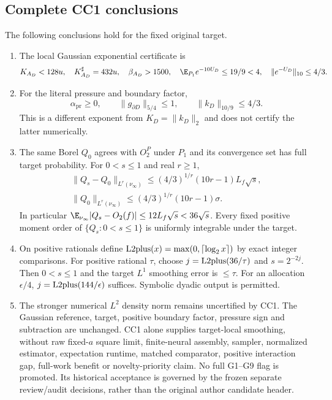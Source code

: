 \subsection{Complete CC1 conclusions}
\begin{theorem}\label{cm:CC1}
The following conclusions hold for the fixed original target.
\begin{enumerate}[label=\textup{CC1.\arabic*},leftmargin=4.6em]
\item The local Gaussian exponential certificate is
\[
 K_{A_D}<128u,\quad K^\sharp_{A_D}=432u,\quad\beta_{A_D}>1500,\quad
 \E_{P_1}e^{-10U_D}\le19/9<4,\quad\|e^{-U_D}\|_{10}\le4/3.
\]
\item For the literal pressure and boundary factor,
\[
 \alpha_{\mathrm{pr}}\ge0,\qquad
 \|g_{\partial D}\|_{5/4}\le1,\qquad \|k_D\|_{10/9}\le4/3.
\]
This is a different exponent from $K_D=\|k_D\|_2$ and does not certify
the latter numerically.
\item The same Borel $Q_0$ agrees with $O_2^P$ under $P_1$ and its
convergence set has full target probability. For $0<s\le1$ and real $r\ge1$,
\begin{gather*}
 \|Q_s-Q_0\|_{L^r(\nu_\infty)}
 \le(4/3)^{1/r}(10r-1)L_f\sqrt s,\\
 \|Q_0\|_{L^r(\nu_\infty)}
 \le(4/3)^{1/r}(10r-1)\sigma.
\end{gather*}
In particular
$\E_{\nu_\infty}|Q_s-O_2(f)|\le12L_f\sqrt s<36\sqrt s$.
Every fixed positive moment order of $\{Q_s:0<s\le1\}$ is uniformly
integrable under the target.
\item On positive rationals define
$\operatorname{L2plus}(x)=\max(0,\lceil\log_2x\rceil)$ by exact integer comparisons.
For positive rational $\tau$, choose
$j=\operatorname{L2plus}(36/\tau)$ and $s=2^{-2j}$. Then $0<s\le1$ and the target
$L^1$ smoothing error is $\le\tau$. For an allocation $\epsilon/4$,
$j=\operatorname{L2plus}(144/\epsilon)$ suffices. Symbolic dyadic output is permitted.
\item The stronger numerical $L^2$ density norm remains uncertified by
CC1. The Gaussian reference, target, positive boundary factor, pressure
sign and subtraction are unchanged. CC1 alone supplies target-local
smoothing, without raw fixed-$a$ square limit, finite-neural assembly,
sampler, normalized estimator, expectation runtime, matched comparator,
positive interaction gap, full-work benefit or novelty-priority claim.
No full G1--G9 flag is promoted. Its historical acceptance is governed
by the frozen separate review/audit decisions, rather than the original
author candidate header.
\end{enumerate}
\end{theorem}

